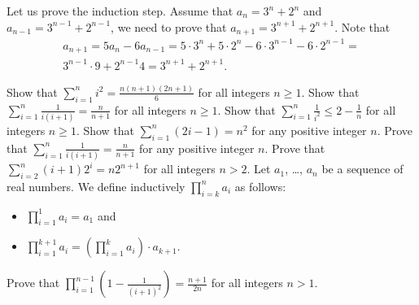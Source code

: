 \begin{chapterendexercises}
\begin{solution}
            Let us prove the induction step. Assume that $a_n = 3^n + 2^n$ and
            $a_{n - 1} = 3^{n - 1} + 2^{n - 1}$, we need to prove that
            $a_{n + 1} = 3^{n + 1} + 2^{n + 1}$. Note that
            \begin{multline*}
                a_{n + 1} = 5a_n - 6 a_{n - 1} =
                5 \cdot 3^n + 5 \cdot 2^n - 6 \cdot 3^{n - 1} -
                6 \cdot 2^{n - 1} = \\
                3^{n - 1} \cdot 9 + 2^{n - 1} 4 = 3^{n + 1} + 2^{n + 1}.
            \end{multline*}
        \end{solution}
    \exercise[recommended] Show that $\sum_{i = 1}^n i^2 =
        \frac{n (n + 1)(2n + 1)}{6}$ for all integers $n \ge 1$.
    \exercise Show that $\sum_{i = 1}^n \frac{1}{i (i + 1)} =
        \frac{n}{n + 1}$ for all integers $n \ge 1$.
    \exercise Show that $\sum_{i = 1}^n \frac{1}{i^2} \le
        2 - \frac{1}{n}$ for all integers $n \ge 1$.
    \exercise Show that $\sum_{i = 1}^n (2i - 1) = n^2$ for any positive
        integer $n$.
    \exercise Prove that $\sum_{i = 1}^n \frac{1}{i (i + 1)} =
        \frac{n}{n + 1}$ for any positive integer $n$.
    \exercise Prove that $\sum_{i = 2}^n (i + 1) 2^i = n 2^{n + 1}$
        for all integers $n > 2$.
    \exercise Let $a_1$, \dots, $a_n$ be a sequence of real numbers.
        We define inductively
        $\prod_{i = k}^n a_i$ as follows:
        \begin{itemize}
            \item $\prod_{i = 1}^1 a_i = a_1$ and
            \item $\prod_{i = 1}^{k + 1} a_i =
                \left( \prod_{i = 1}^k a_i \right) \cdot a_{k + 1}$.
        \end{itemize}

        Prove that
        $\prod_{i = 1}^{n - 1} \left(1 - \frac{1}{(i + 1)^2} \right) =
        \frac{n + 1}{2n}$ for all integers $n > 1$.


\end{chapterendexercises}
